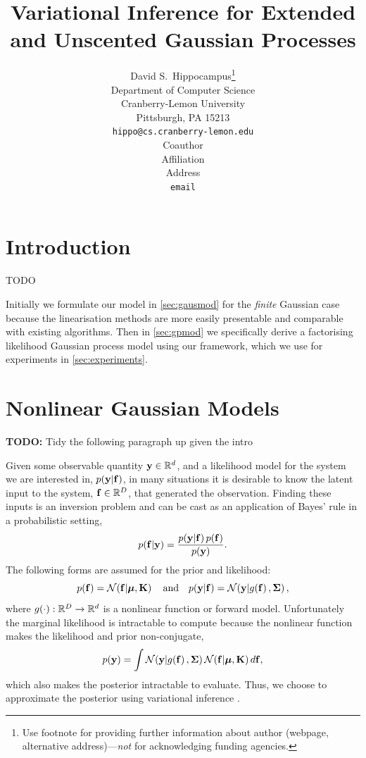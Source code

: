 \documentclass{article} %
\title{Variational Inference for Extended and Unscented Gaussian Processes}
\author{
David S.~Hippocampus\thanks{Use footnote for providing further information
about author (webpage, alternative address)---\emph{not} for acknowledging
funding agencies.} \\
Department of Computer Science\\
Cranberry-Lemon University\\
Pittsburgh, PA 15213 \\
\texttt{hippo@cs.cranberry-lemon.edu} \\
\And
Coauthor \\
Affiliation \\
Address \\
\texttt{email} \\
}
\begin{document}
\maketitle

\begin{abstract}
\end{abstract}

\section{Introduction}

TODO

Initially we formulate our model in \autoref{sec:gausmod} for the \emph{finite}
Gaussian case because the linearisation methods are more easily presentable and
comparable with existing algorithms. Then in \autoref{sec:gpmod} we
specifically derive a factorising likelihood Gaussian process model using our
framework, which we use for experiments in \autoref{sec:experiments}.


\section{Nonlinear Gaussian Models}
\label{sec:gausmod}

\textbf{TODO:} Tidy the following paragraph up given the intro

Given some observable quantity $\mathbf{y} \in \mathbb{R}^{d}$, and a likelihood model for
the system we are interested in, $p\!\left({\mathbf{y}}\middle\vert{\ensuremath{\mathbf{f}}}\right)$, in many situations it
is desirable to know the latent input to the system, $\mathbf{f}\in\mathbb{R}^{D}$, that
generated the observation. Finding these inputs is an inversion problem and can
be cast as an application of Bayes' rule in a probabilistic setting,
\begin{equation}
    p\!\left({\mathbf{f}}\middle\vert{\ensuremath{\mathbf{y}}}\right) = \frac{p\!\left({\mathbf{y}}\middle\vert{\ensuremath{\mathbf{f}}}\right)p\!\left({\mathbf{f}}\right)}
        {p\!\left({\mathbf{y}}\right)}.
    \label{eq:bayesrule}
\end{equation}
The following forms are assumed for the prior and likelihood:
\begin{equation}
    p\!\left({\mathbf{f}}\right) = \mathcal{N}\!\left({\mathbf{f}}\middle\vert{\ensuremath{\boldsymbol{\mu}}, \ensuremath{\mathbf{K}}}\right)
    \quad \text{and} \quad
    p\!\left({\mathbf{y}}\middle\vert{\ensuremath{\mathbf{f}}}\right) = \mathcal{N}\!\left({\mathbf{y}}\middle\vert{\ensuremath{g\!\left({{\mathbf{f}}}\right)}, \ensuremath{\boldsymbol{\Sigma}}}\right),
    \label{eq:priorlike}
\end{equation}
where $g\!\left({{\cdot}}\right) : \mathbb{R}^{D} \to \mathbb{R}^{d}$ is a nonlinear function or
forward model. Unfortunately the marginal likelihood is intractable to compute
because the nonlinear function makes the likelihood and prior non-conjugate,
\begin{equation}
    p\!\left({\mathbf{y}}\right) = \int \mathcal{N}\!\left({\mathbf{y}}\middle\vert{\ensuremath{g\!\left({{\mathbf{f}}}\right)}, \ensuremath{\boldsymbol{\Sigma}}}\right)
        \mathcal{N}\!\left({\mathbf{f}}\middle\vert{\ensuremath{\boldsymbol{\mu}}, \ensuremath{\mathbf{K}}}\right) d\mathbf{f},
    \label{eq:marglike}
\end{equation}
which also makes the posterior intractable to evaluate. Thus, we choose to
approximate the posterior using variational inference \cite{Jordan1999}.
\end{document}
